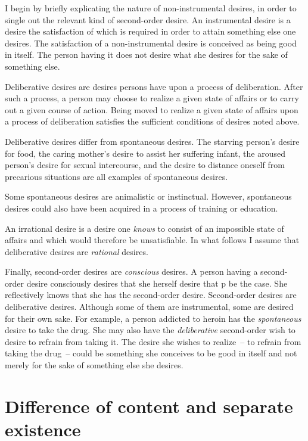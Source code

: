 \documentclass[output=paper]{langscibook}
\begin{document}
I begin by briefly explicating the nature of non-instrumental desires, in order to single out the relevant kind of second-order desire. 
An instrumental desire is a desire the satisfaction of which is required in order to attain something else one desires. The satisfaction of a non-instrumental desire is conceived as being good in itself. The person having it does not desire what she desires for the sake of something else.

Deliberative desires are desires persons have upon a process of deliberation. After such a process, a person may choose to realize a given state of affairs or to carry out a given course of action. Being moved to realize a given state of affairs upon a process of deliberation satisfies the sufficient conditions of desires noted above. 

Deliberative desires differ from spontaneous desires. The starving person's desire for food, the caring mother's desire to assist her suffering infant, the aroused person's desire for sexual intercourse, and the desire to distance oneself from precarious situations are all examples of spontaneous desires.

Some spontaneous desires are animalistic or instinctual. However, spontaneous desires could also have been acquired in a process of training or education. 

An irrational desire is a desire one \textit{knows} to consist of an impossible state of affairs and which would therefore be unsatisfiable. In what follows I assume that deliberative desires are \textit{rational} desires.

Finally, second-order desires are \textit{conscious} desires. A person having a second-order desire consciously desires that she herself desire that p be the case. She reflectively knows that she has the second-order desire. Second-order desires are deliberative desires. Although some of them are instrumental, some are desired for their own sake. For example, a person addicted to heroin has the \textit{spontaneous} desire to take the drug. She may also have the \textit{deliberative} second-order wish to desire to refrain from taking it. The desire she wishes to realize~– to refrain from taking the drug~– could be something she conceives to be good in itself and not merely for the sake of something else she desires.

\section{Difference of content and separate existence}
\end{document}
